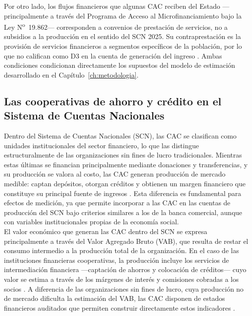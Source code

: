 Por otro lado, los flujos financieros que algunas CAC reciben del Estado 
---principalmente a través del Programa de Acceso al Microfinanciamiento 
bajo la Ley N\textsuperscript{o}~19.862--- corresponden a convenios de 
prestación de servicios, no a subsidios a la producción en el sentido del 
SCN 2025. Su contraprestación es la provisión de servicios financieros a 
segmentos específicos de la población, por lo que no califican como D3 en 
la cuenta de generación del ingreso . 
Ambas condiciones condicionan directamente los supuestos del modelo de 
estimación desarrollado en el Capítulo~\ref{ch:metodologia}.

\subsection{Las cooperativas de ahorro y crédito en el Sistema de Cuentas Nacionales}
\label{subsec:cac-scn}
Dentro del Sistema de Cuentas Nacionales (SCN), las CAC se clasifican como unidades 
institucionales del sector financiero, lo que las distingue estructuralmente de las 
organizaciones sin fines de lucro tradicionales. Mientras estas últimas se financian 
principalmente mediante donaciones y transferencias, y su producción se valora al costo, 
las CAC generan producción de mercado medible: captan depósitos, otorgan créditos y 
obtienen un margen financiero que constituye su principal fuente de ingresos 
\cite{barea_tejeiro_manual_2007}. Esta diferencia es fundamental para efectos de medición, 
ya que permite incorporar a las CAC en las cuentas de producción del SCN bajo criterios 
similares a los de la banca comercial, aunque con variables institucionales propias de la 
economía social.\\

El valor económico que generan las CAC dentro del SCN se expresa 
principalmente a través del Valor Agregado Bruto (VAB), que resulta de 
restar el consumo intermedio a la producción total de la organización. En 
el caso de las instituciones financieras cooperativas, la producción incluye 
los servicios de intermediación financiera ---captación de ahorros y 
colocación de créditos--- cuyo valor se estima a través de los márgenes de 
interés y comisiones cobradas a los socios \cite{vereinte_nationen_satellite_2018}. 
A diferencia de las organizaciones sin fines de lucro, cuya producción no 
de mercado dificulta la estimación del VAB, las CAC disponen de estados 
financieros auditados que permiten construir directamente estos indicadores 
\cite{uzea_challenges_2015}.\\


